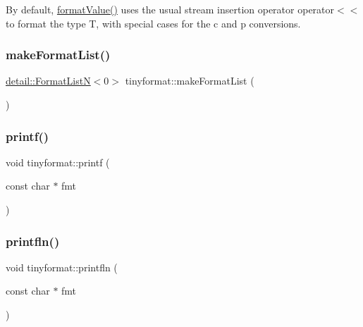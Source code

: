 By default, \mbox{\hyperlink{namespacetinyformat_a875b4e4f642b74394598804a1b012f9d}{format\+Value()}} uses the usual stream insertion operator operator$<$$<$ to format the type T, with special cases for the c and p conversions. \mbox{\label{namespacetinyformat_ab7b10973ec89e6601353675a85f99d61}} 
\subsubsection{\texorpdfstring{make\+Format\+List()}{makeFormatList()}}
{\footnotesize\ttfamily \mbox{\hyperlink{classtinyformat_1_1detail_1_1_format_list_n}{detail\+::\+Format\+ListN}}$<$0$>$ tinyformat\+::make\+Format\+List (\begin{DoxyParamCaption}{ }\end{DoxyParamCaption})\hspace{0.3cm}{\ttfamily [inline]}}

\mbox{\label{namespacetinyformat_a970fd8292e14eb74ba55bafb41017016}} 
\subsubsection{\texorpdfstring{printf()}{printf()}}
{\footnotesize\ttfamily void tinyformat\+::printf (\begin{DoxyParamCaption}\item[{const char $\ast$}]{fmt }\end{DoxyParamCaption})\hspace{0.3cm}{\ttfamily [inline]}}

\mbox{\label{namespacetinyformat_a97775445fea05ffaaa0690ab3bb1a920}} 
\subsubsection{\texorpdfstring{printfln()}{printfln()}}
{\footnotesize\ttfamily void tinyformat\+::printfln (\begin{DoxyParamCaption}\item[{const char $\ast$}]{fmt }\end{DoxyParamCaption})\hspace{0.3cm}{\ttfamily [inline]}}

